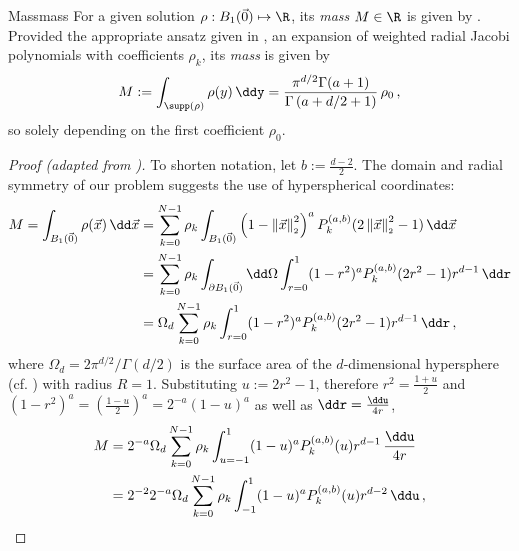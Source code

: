 \begin{lemma}{Mass}{mass}
  For a given solution $\rho: B_1(\vec{0}) \mapsto \R$, its \textit{mass} $M \in \R$ is given by .
  Provided the appropriate ansatz given in , an expansion of weighted radial Jacobi polynomials with coefficients $\rho_k$, its \textit{mass} is given by
  \begin{align*}
    M := \int_{\supp(\rho)} \rho(y) \,\ddy = \frac{\pi^{{d/2}}\Gamma (a+1)}{\Gamma \left(a+{d/2}+1\right)}\, \rho_0\,,
  \end{align*}
  so solely depending on the first coefficient $\rho_0$.
\end{lemma}
\begin{proof}[Proof (adapted from \cite{2021-arbitrary-dimensions})]
  To shorten notation, let $b := \frac{d-2}{2}$.
  The domain and radial symmetry of our problem suggests the use of hyperspherical coordinates:
  \begin{align*}
    M = \int_{B_1(\vec{0})} \rho(\vec{x}) \,\dd\vec{x} & = \sum_{k=0}^{N-1} \rho_k \int_{B_1(\vec{0})} \weight{x} P_k^{(a,b)}(\jacobiarg{x}) \,\dd\vec{x}                          \\
                                                       & =\sum_{k=0}^{N-1} \rho_k \int_{\partial B_1(\vec{0})} \dd\Omega \int_{r=0}^1 (1-r^2)^a P_k^{(a,b)}(2r^2-1) r^{d-1} \,\ddr \\
                                                       & = \Omega_d \sum_{k=0}^{N-1} \rho_k \int_{r=0}^1 (1-r^2)^a P_k^{(a,b)}(2r^2-1) r^{d-1} \,\ddr\,,
  \end{align*}
  where $\Omega_d = {2\pi^{d/2}} / {\Gamma({d/2})}$ is the surface area of the $d$-dimensional hypersphere (cf. ) with radius $R = 1$.
  Substituting $u := 2r^2-1$, therefore $r^2 = \frac{1+u}{2}$ and $(1-r^2)^a = \left(\frac{1-u}{2}\right)^a = 2^{-a} (1-u)^a$ as well as $\ddr = \frac{\ddu}{4r}$,
  \begin{align*}
    M & = 2^{-a} \Omega_d \sum_{k=0}^{N-1} \rho_k \int_{u=-1}^1 (1-u)^a P_k^{(a,b)}(u) r^{d-1} \,\frac{\ddu}{4r} \\
      & = 2^{-2} 2^{-a} \Omega_d \sum_{k=0}^{N-1} \rho_k \int_{-1}^1 (1-u)^a P_k^{(a,b)}(u) r^{d-2}\,\ddu\,,

\end{align*}
\end{proof}
